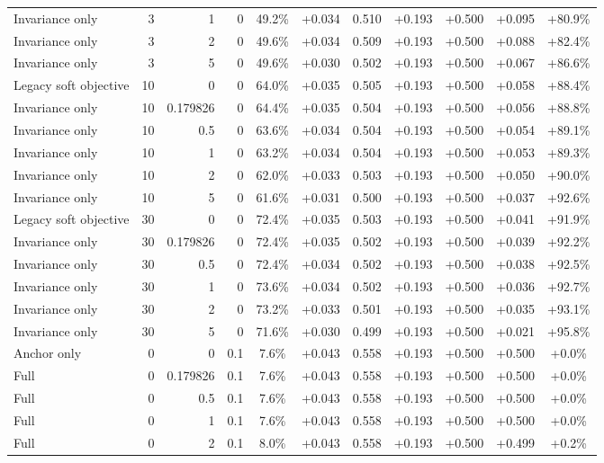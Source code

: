 \begin{table}[htbp]
\begin{tabular}{lrrrccccccc}
Invariance only & 3 & 1 & 0 & 49.2\% & +0.034 & 0.510 & +0.193 & +0.500 & +0.095 & +80.9\% \\
Invariance only & 3 & 2 & 0 & 49.6\% & +0.034 & 0.509 & +0.193 & +0.500 & +0.088 & +82.4\% \\
Invariance only & 3 & 5 & 0 & 49.6\% & +0.030 & 0.502 & +0.193 & +0.500 & +0.067 & +86.6\% \\
Legacy soft objective & 10 & 0 & 0 & 64.0\% & +0.035 & 0.505 & +0.193 & +0.500 & +0.058 & +88.4\% \\
Invariance only & 10 & 0.179826 & 0 & 64.4\% & +0.035 & 0.504 & +0.193 & +0.500 & +0.056 & +88.8\% \\
Invariance only & 10 & 0.5 & 0 & 63.6\% & +0.034 & 0.504 & +0.193 & +0.500 & +0.054 & +89.1\% \\
Invariance only & 10 & 1 & 0 & 63.2\% & +0.034 & 0.504 & +0.193 & +0.500 & +0.053 & +89.3\% \\
Invariance only & 10 & 2 & 0 & 62.0\% & +0.033 & 0.503 & +0.193 & +0.500 & +0.050 & +90.0\% \\
Invariance only & 10 & 5 & 0 & 61.6\% & +0.031 & 0.500 & +0.193 & +0.500 & +0.037 & +92.6\% \\
Legacy soft objective & 30 & 0 & 0 & 72.4\% & +0.035 & 0.503 & +0.193 & +0.500 & +0.041 & +91.9\% \\
Invariance only & 30 & 0.179826 & 0 & 72.4\% & +0.035 & 0.502 & +0.193 & +0.500 & +0.039 & +92.2\% \\
Invariance only & 30 & 0.5 & 0 & 72.4\% & +0.034 & 0.502 & +0.193 & +0.500 & +0.038 & +92.5\% \\
Invariance only & 30 & 1 & 0 & 73.6\% & +0.034 & 0.502 & +0.193 & +0.500 & +0.036 & +92.7\% \\
Invariance only & 30 & 2 & 0 & 73.2\% & +0.033 & 0.501 & +0.193 & +0.500 & +0.035 & +93.1\% \\
Invariance only & 30 & 5 & 0 & 71.6\% & +0.030 & 0.499 & +0.193 & +0.500 & +0.021 & +95.8\% \\
Anchor only & 0 & 0 & 0.1 & 7.6\% & +0.043 & 0.558 & +0.193 & +0.500 & +0.500 & +0.0\% \\
Full & 0 & 0.179826 & 0.1 & 7.6\% & +0.043 & 0.558 & +0.193 & +0.500 & +0.500 & +0.0\% \\
Full & 0 & 0.5 & 0.1 & 7.6\% & +0.043 & 0.558 & +0.193 & +0.500 & +0.500 & +0.0\% \\
Full & 0 & 1 & 0.1 & 7.6\% & +0.043 & 0.558 & +0.193 & +0.500 & +0.500 & +0.0\% \\
Full & 0 & 2 & 0.1 & 8.0\% & +0.043 & 0.558 & +0.193 & +0.500 & +0.499 & +0.2\% \\

\end{tabular}
\end{table}
